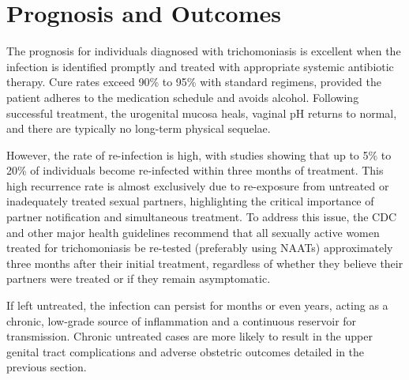 \section*{Prognosis and Outcomes}
The prognosis for individuals diagnosed with trichomoniasis is excellent when the infection is identified promptly and treated with appropriate systemic antibiotic therapy. Cure rates exceed 90\% to 95\% with standard regimens, provided the patient adheres to the medication schedule and avoids alcohol. Following successful treatment, the urogenital mucosa heals, vaginal pH returns to normal, and there are typically no long-term physical sequelae.

However, the rate of re-infection is high, with studies showing that up to 5\% to 20\% of individuals become re-infected within three months of treatment. This high recurrence rate is almost exclusively due to re-exposure from untreated or inadequately treated sexual partners, highlighting the critical importance of partner notification and simultaneous treatment. To address this issue, the CDC and other major health guidelines recommend that all sexually active women treated for trichomoniasis be re-tested (preferably using NAATs) approximately three months after their initial treatment, regardless of whether they believe their partners were treated or if they remain asymptomatic.

If left untreated, the infection can persist for months or even years, acting as a chronic, low-grade source of inflammation and a continuous reservoir for transmission. Chronic untreated cases are more likely to result in the upper genital tract complications and adverse obstetric outcomes detailed in the previous section.


